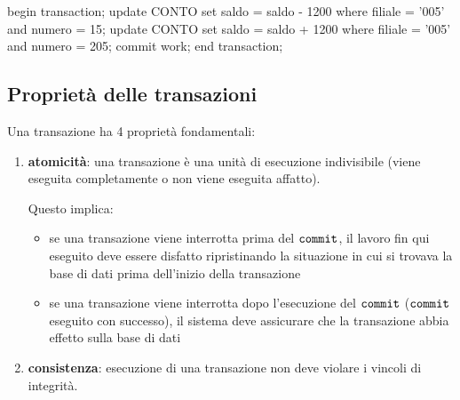 \begin{sqlcode}
  begin transaction;
    update CONTO set saldo = saldo - 1200
      where filiale = '005' and numero = 15;
    update CONTO set saldo = saldo + 1200
      where filiale = '005' and numero = 205;
    commit work;
  end transaction;
\end{sqlcode}

\subsection{Proprietà delle transazioni}
Una transazione ha 4 proprietà fondamentali:
\begin{enumerate}[itemsep=\smallskipamount]
  \item \textcolor{azzurrino}{\textbf{atomicità}}: una transazione è una unità di esecuzione indivisibile (viene eseguita completamente o non viene eseguita affatto).
  
  Questo implica:
  \begin{itemize}[label=$\diamond$, itemsep=\smallskipamount]
    \item se una transazione viene interrotta prima del $\verb|commit|$, il lavoro fin qui eseguito deve essere disfatto ripristinando la situazione in cui si trovava la base di dati prima dell’inizio della transazione
    \item se una transazione viene interrotta dopo l’esecuzione del $\verb|commit|$ ($\verb|commit|$ eseguito con successo), il sistema deve assicurare che la transazione abbia effetto sulla base di dati
  \end{itemize}
  \item \textcolor{azzurrino}{\textbf{consistenza}}: esecuzione di una transazione non deve violare i vincoli di integrità.
  

\end{enumerate}
